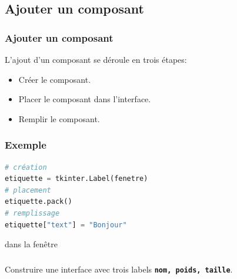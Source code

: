 \documentclass[svgnames,11pt]{beamer}
\begin{document}
\subsection{Ajouter un composant}
\begin{frame}
    \frametitle{Ajouter un composant}

    L'ajout d'un composant se déroule en trois étapes:
    \begin{itemize}
        \item Créer le composant.
        \item Placer le composant dans l'interface.
        \item Remplir le composant.
    \end{itemize}

\end{frame}
\begin{frame}[fragile]
    \frametitle{Exemple}

    \begin{center}
        \begin{lstlisting}[language=Python,basicstyle=\small]
# création
etiquette = tkinter.Label(fenetre)
# placement
etiquette.pack()
# remplissage
etiquette["text"] = "Bonjour"
\end{lstlisting}
         dans la fenêtre
        \label{label}
    \end{center}

\end{frame}
\begin{frame}
    \frametitle{}
    \begin{activite}
        Construire une interface avec trois labels \textbf{\texttt{nom, poids, taille}}.
    \end{activite}


\end{frame}
\end{document}
